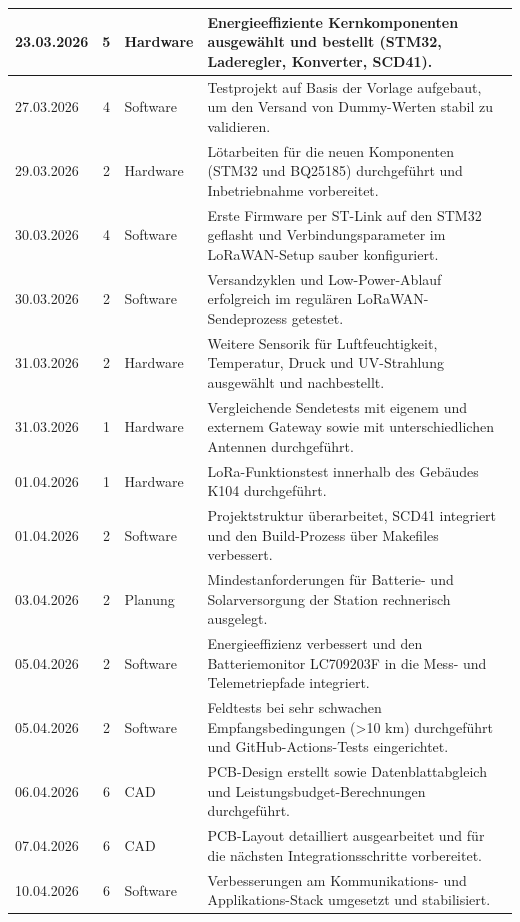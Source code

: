 \begin{longtable}{|l|c|l|p{7.5cm}|}
23.03.2026 & 5 & Hardware & Energieeffiziente Kernkomponenten ausgewählt und bestellt (STM32, Laderegler, Konverter, SCD41). \\
\hline
27.03.2026 & 4 & Software & Testprojekt auf Basis der Vorlage aufgebaut, um den Versand von Dummy-Werten stabil zu validieren. \\
\hline
29.03.2026 & 2 & Hardware & Lötarbeiten für die neuen Komponenten (STM32 und BQ25185) durchgeführt und Inbetriebnahme vorbereitet. \\
\hline
30.03.2026 & 4 & Software & Erste Firmware per ST-Link auf den STM32 geflasht und Verbindungsparameter im LoRaWAN-Setup sauber konfiguriert. \\
\hline
30.03.2026 & 2 & Software & Versandzyklen und Low-Power-Ablauf erfolgreich im regulären LoRaWAN-Sendeprozess getestet. \\
\hline
31.03.2026 & 2 & Hardware & Weitere Sensorik für Luftfeuchtigkeit, Temperatur, Druck und UV-Strahlung ausgewählt und nachbestellt. \\
\hline
31.03.2026 & 1 & Hardware & Vergleichende Sendetests mit eigenem und externem Gateway sowie mit unterschiedlichen Antennen durchgeführt. \\
\hline
01.04.2026 & 1 & Hardware & LoRa-Funktionstest innerhalb des Gebäudes K104 durchgeführt. \\
\hline
01.04.2026 & 2 & Software & Projektstruktur überarbeitet, SCD41 integriert und den Build-Prozess über Makefiles verbessert. \\
\hline
03.04.2026 & 2 & Planung & Mindestanforderungen für Batterie- und Solarversorgung der Station rechnerisch ausgelegt. \\
\hline
05.04.2026 & 2 & Software & Energieeffizienz verbessert und den Batteriemonitor LC709203F in die Mess- und Telemetriepfade integriert. \\
\hline
05.04.2026 & 2 & Software & Feldtests bei sehr schwachen Empfangsbedingungen (\textgreater{}10 km) durchgeführt und GitHub-Actions-Tests eingerichtet. \\
\hline
06.04.2026 & 6 & CAD & PCB-Design erstellt sowie Datenblattabgleich und Leistungsbudget-Berechnungen durchgeführt. \\
\hline
07.04.2026 & 6 & CAD & PCB-Layout detailliert ausgearbeitet und für die nächsten Integrationsschritte vorbereitet. \\
\hline
10.04.2026 & 6 & Software & Verbesserungen am Kommunikations- und Applikations-Stack umgesetzt und stabilisiert. \\

\end{longtable}
